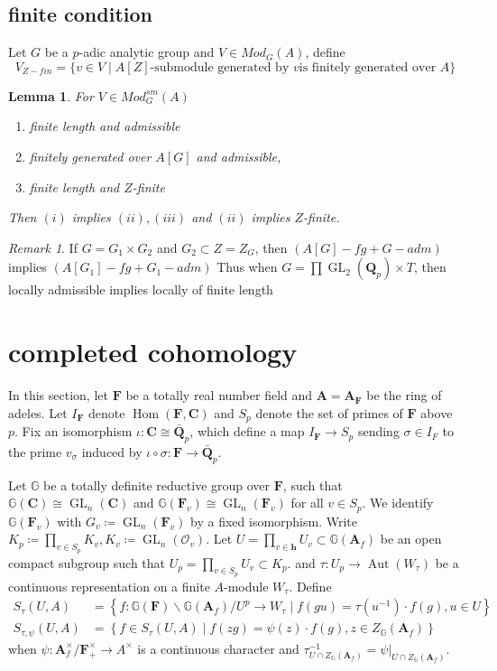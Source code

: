\documentclass[leqno]{amsart}
\newcommand{\GG}{\mathbb G}
\DeclareMathOperator{\GL}{GL}
\newcommand{\Q}{{\mathbf{Q}}}
\newcommand{\Qp}{\mathbf{Q}_p}
\newcommand{\C}{\mathbf C}
\newcommand{\A}{\mathbf A}
\newcommand{\finite}{\mathbf{h}}
\newcommand{\F}{{\mathbf{F}}} %
\newcommand{\oo}{\mathcal O}
\newcommand{\1}{\mathbf{1}}
\DeclareMathOperator{\Hom}{Hom}
\DeclareMathOperator{\Aut}{Aut}
\newtheorem{lem}[thm]{Lemma}
\theoremstyle{definition}
\theoremstyle{remark}
\newtheorem{rem}[thm]{Remark}
\begin{document}
\subsection{finite condition}

Let $G$ be a  $p$-adic analytic group
and  $V\in Mod_G(A)$, define 
 \[
	V_{Z-fin}=
	\{v\in V\mid \text{$A[Z]$-submodule generated by  $v$
	is finitely generated over  $A$}\}
\]
\begin{lem}
	For $V\in Mod_G^{sm}(A)$
	\begin{enumerate}[label=(\alph*)]
		\item finite length and admissible
		\item finitely generated over $A[G]$
			and admissible, 
		\item finite length and $Z$-finite
	\end{enumerate}
	Then $(i)$ implies $(ii), (iii)$
	and $(ii)$ implies  $Z$-finite.
\end{lem}

\begin{rem}
	If $G=G_1\times G_2$ and  $G_2\subset Z=Z_G$,
	then  $(A[G]-fg + G-adm)$ 
	implies  $(A[G_1]-fg + G_1-adm)$ 
	Thus when
	$G=\prod\GL_2(\Qp)\times T$,
	then locally admissible 
	implies locally of finite length
\end{rem}

\section{completed cohomology}

In this section, 
let $\F$ be a totally real number field
and  $\A=\A_\F$ be the ring of adeles.
Let $I_\F$ denote $\Hom(\F,\C)$
and $S_p$ denote the set of primes of $\F$ above $p$.
Fix an isomorphism $\iota\colon \C\cong \bar{\Q}_p$,
which define a map $I_\F\to S_p$
sending  $\sigma\in I_F$
to the prime  $v_\sigma$
induced by  $\iota\circ \sigma\colon \F\to \bar{\Q}_p$.

Let  $\GG$ be a totally definite reductive group over  $\F$,
such that  $\GG(\C)\cong \GL_n(\C)$
and $\GG(\F_v)\cong \GL_n(\F_v)$
for all  $v\in S_p$.
We identify $\GG(\F_v)$
with  $G_v\coloneqq \GL_n(\F_v)$ by a fixed isomorphism.
Write $K_p\coloneqq \prod_{v\in S_p}K_v, K_v\coloneqq \GL_n(\oo_v)$.
Let $U=\prod_{v\in\finite}U_v\subset \GG(\A_f)$
be an open compact subgroup 
such that $U_p=\prod_{v\in S_p}U_v\subset K_p$.
and  $\tau\colon U_p\to \Aut(W_\tau)$
be a continuous representation on a finite  $A$-module  $W_\tau$.
Define
\begin{align}
S_{\tau}(U,A)&=
\left\{ f: \GG(\F)\backslash \GG(\A_f)/U^p \rightarrow W_\tau 
\mid f(gu)=\tau(u^{-1})\cdot f(g), u\in U\right\} \\
S_{\tau,\psi}(U,A)&=\left\{
f\in S_{\tau}(U,A)
\mid f(zg)=\psi(z)\cdot f(g), z\in Z_{\GG}(\A_f)\right\} 
\end{align}
when $\psi\colon \A_f^\times/\F_+^\times\to A^\times$ 
is a continuous character
and 
$\tau^{-1}_{U\cap Z_{\GG}(\A_f)}=\psi|_{U\cap Z_{\GG}(\A_f)}$.
\end{document}
